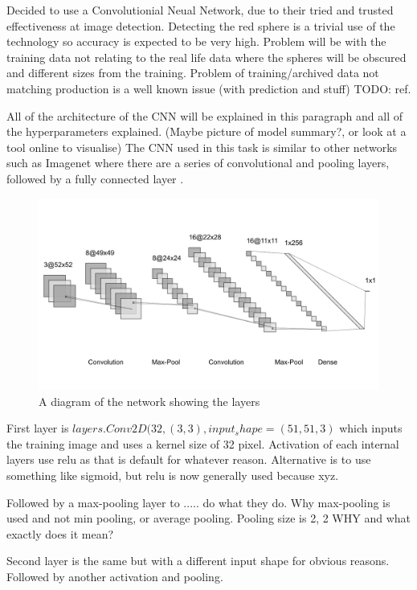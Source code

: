\documentclass{article}
\begin{document}
Decided to use a Convolutionial Neual Network, due to their tried and trusted effectiveness at image detection.
Detecting the red sphere is a trivial use of the technology so accuracy is expected to be very high.
Problem will be with the training data not relating to the real life data where the spheres will be obscured and different sizes from the training.
Problem of training/archived data not matching production is a well known issue (with prediction and stuff) TODO: ref.

All of the architecture of the CNN will be explained in this paragraph and all of the hyperparameters explained.
(Maybe picture of model summary?, or look at a tool online to visualise)
The CNN used in this task is similar to other networks such as Imagenet where there are a series of convolutional and pooling layers, followed by a fully connected layer \cite{krizhevsky2012imagenet}.

\begin{figure}[ht]
    \centering
    \includegraphics[scale=1]{CNN_Zoomed.png}
    \caption{A diagram of the network showing the layers \cite{LeNail2019}}
    \label{fig:test}
\end{figure}


First layer is 
$layers.Conv2D(32, (3, 3), input_shape=(51, 51, 3)$
which inputs the training image and uses a kernel size of 32 pixel.
Activation of each internal layers use relu as that is default for whatever reason.
Alternative is to use something like sigmoid, but relu is now generally used because xyz. 

Followed by a max-pooling layer to ..... do what they do.
Why max-pooling is used and not min pooling, or average pooling.
Pooling size is 2, 2 WHY and what exactly does it mean?

Second layer is the same but with a different input shape for obvious reasons.
Followed by another activation and pooling.
\end{document}
